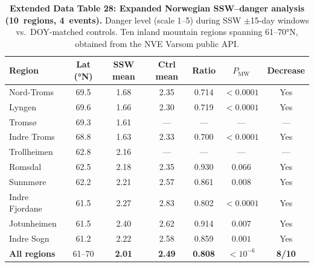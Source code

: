 \documentclass[11pt,letterpaper]{article}
\begin{document}
\begin{table}[htbp]
\caption{\textbf{Extended Data Table 28: Expanded Norwegian SSW--danger analysis (10~regions, 4~events).}
Danger level (scale 1--5) during SSW $\pm$15-day windows vs.\ DOY-matched controls. Ten inland mountain regions spanning 61--70°N, obtained from the NVE Varsom public API.}
\label{tab:norway_expanded}
\small
\begin{tabular}{lcccccc}
\toprule
Region & Lat (°N) & SSW mean & Ctrl mean & Ratio & $P_{\mathrm{MW}}$ & Decrease \\
\midrule
Nord-Troms & 69.5 & 1.68 & 2.35 & 0.714 & $< 0.0001$ & Yes \\
Lyngen & 69.6 & 1.66 & 2.30 & 0.719 & $< 0.0001$ & Yes \\
Tromsø & 69.3 & 1.61 & --- & --- & --- & --- \\
Indre Troms & 68.8 & 1.63 & 2.33 & 0.700 & $< 0.0001$ & Yes \\
Trollheimen & 62.8 & 2.16 & --- & --- & --- & --- \\
Romsdal & 62.5 & 2.18 & 2.35 & 0.930 & $0.066$ & Yes \\
Sunnmøre & 62.2 & 2.21 & 2.57 & 0.861 & $0.008$ & Yes \\
Indre Fjordane & 61.5 & 2.27 & 2.83 & 0.802 & $< 0.0001$ & Yes \\
Jotunheimen & 61.5 & 2.40 & 2.62 & 0.914 & $0.007$ & Yes \\
Indre Sogn & 61.2 & 2.22 & 2.58 & 0.859 & $0.001$ & Yes \\
\midrule
\textbf{All regions} & 61--70 & \textbf{2.01} & \textbf{2.49} & \textbf{0.808} & $< 10^{-6}$ & \textbf{8/10} \\
\bottomrule
\end{tabular}
\end{table}
\end{document}
